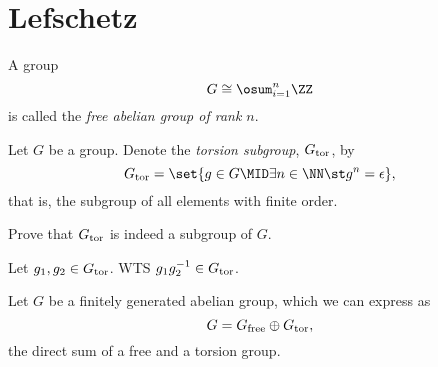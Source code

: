 \section{Lefschetz}
\begin{definition}
  A group
  \[
    G \cong \osum_{i=1}^n \ZZ
  \]
  is called the \emph{free abelian group of rank $n$}.
\end{definition}
\begin{definition}
  Let $G$ be a group. Denote the \emph{torsion subgroup}, $G_{\rm
    tor}$, by
  \[
    G_{\rm tor} = \set{g \in G \MID \exists n \in \NN \st g^n =
      \epsilon},
  \]
  that is, the subgroup of all elements with finite order.
\end{definition}
\begin{problem}[FK]
  Prove that $G_{\rm tor}$ is indeed a subgroup of $G$.
\end{problem}
\begin{solution}
  Let $g_1, g_2 \in G_{\rm tor}$. WTS $g_1 g_2^{-1} \in G_{\rm tor}$.

\end{solution}
\begin{definition}
  Let $G$ be a finitely generated abelian group, which we can express
  as
  \[
    G = G_{\rm free} \oplus G_{\rm tor},
  \]
  the direct sum of a free and a torsion group.
\end{definition}

